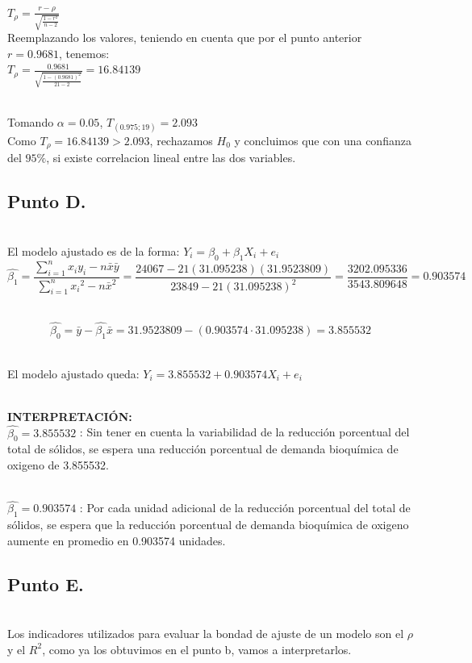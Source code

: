 \documentclass[letterpaper,12pt,onecolumn,titlepage]{article}
\begin{document}
~\\ $T_{\rho}=\frac{r-\rho}{\sqrt{\frac{1-r^2}{n-2}}}$
~\\ Reemplazando los valores, teniendo en cuenta que por el punto anterior $r=0.9681$, tenemos:
~\\ $T_{\rho}=\frac{0.9681}{\sqrt{\frac{1-(0.9681)^2}{21-2}}}=16.84139$

~\\ Tomando $\alpha=0.05$, $T_{(0.975;19)}=2.093$
~\\ Como $T_{\rho}=16.84139>2.093$, rechazamos $H_{0}$ y concluimos que con una confianza del $95\%$, si existe correlacion lineal entre las dos variables.  
\subsection{Punto D.}
~\\ El modelo ajustado es de la forma: $Y_{i}=\beta_{0}+\beta_{1}X_{i}+e_{i}$
~\\ $$\hat{\beta_{1}}=\frac{\sum\limits_{i=1}^{n}x_{i}y_{i}-n\bar{x}\bar{y}}{\sum\limits_{i=1}^{n}{x_{i}}^2 - n\bar{x}^2}=\frac{24067-21(31.095238)(31.9523809)}{23849-21(31.095238)^2}=\frac{3202.095336}{3543.809648}=0.903574$$

~\\ $$\hat{\beta_{0}}=\bar{y}-\hat{\beta_{1}}\bar{x}=31.9523809-(0.903574\cdot 31.095238)=3.855532$$

~\\ El modelo ajustado queda: $Y_{i}=3.855532+0.903574 X_{i}+ e_{i}$

~\\ \textbf{INTERPRETACI\'{O}N:}
~\\ $\hat{\beta_{0}}=3.855532$ : Sin tener en cuenta la variabilidad de la reducci\'{o}n porcentual del total de s\'{o}lidos, se espera una reducci\'{o}n porcentual de demanda bioqu\'{i}mica de oxigeno de 3.855532.

~\\ $\hat{\beta_{1}}=0.903574$ : Por cada unidad adicional de la reducci\'{o}n porcentual del total de s\'{o}lidos, se espera que la reducci\'{o}n porcentual de demanda bioqu\'{i}mica de oxigeno aumente en promedio en 0.903574 unidades.

\pagebreak\subsection{Punto E.}
~\\ Los indicadores utilizados para evaluar la bondad de ajuste de un modelo son el $\rho$ y el $R^2$, como ya los obtuvimos en el punto b, vamos a interpretarlos.
\end{document}
